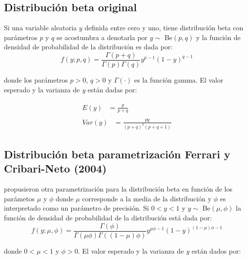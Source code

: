 \subsection{Distribuci\'{o}n beta original}

Si una variable aleatoria $y$ definida entre cero y uno, tiene distribuci\'{o}n beta con par\'{a}metros $p$ y $q$ se acostumbra a denotarla por $y \sim$ Be$(p,q)$ y la funci\'{o}n de densidad de probabilidad de la distribuci\'{o}n es dada por:
\begin{equation}
f(y;p,q)=\frac{\Gamma(p+q)}{\Gamma(p)\Gamma(q)}y^{p-1}(1-y)^{q-1}
\end{equation}

donde los par\'{a}metros $p>0$, $q>0$ y $\Gamma(\cdot)$ es la funci\'{o}n gamma. El valor esperado y la varianza de \textit{y} est\'{a}n dadas por:

\begin{align}
\begin{split}
	E(y) &= \frac{p}{p+q} 
\end{split} \label{E_Origin} \\
\begin{split}
	Var(y) &= \frac{pq}{(p+q)^2(p+q+1)}
\end{split} \label{V_Origin}
\end{align}


\subsection{Distribuci\'{o}n beta parametrizaci\'{o}n Ferrari y Cribari-Neto (2004)}


\cite{Ferrari2} propusieron otra parametrizaci\'{o}n para la distribuci\'{o}n beta en funci\'{o}n de los par\'{a}metos $\mu$ y $\phi$ donde $\mu$ corresponde a la media de la distribuci\'{o}n y $\phi$ es interpretado como un par\'{a}metro de precisi\'{o}n. Si $0<y<1$ y $y \sim$ Be$(\mu,\phi)$ la funci\'{o}n de densidad de probabilidad de la distribuci\'{o}n est\'{a} dada por:
\begin{equation}
f(y;\mu,\phi)=\frac{\Gamma(\phi)}{\Gamma(\mu\phi)\Gamma((1-\mu)\phi)}y^{\mu\phi-1}(1-y)^{(1-\mu)\phi-1}
\end{equation}

donde $0<\mu<1$ y $\phi>0$. El valor esperado y la varianza de \textit{y} est\'{a}n dados por:


